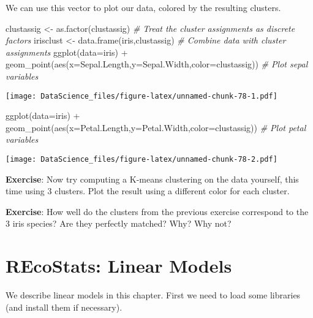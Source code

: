 \documentclass[
]{book}
\newenvironment{Shaded}{\begin{snugshade}}{\end{snugshade}}
\newcommand{\AttributeTok}[1]{\textcolor[rgb]{0.77,0.63,0.00}{#1}}
\newcommand{\CommentTok}[1]{\textcolor[rgb]{0.56,0.35,0.01}{\textit{#1}}}
\newcommand{\FunctionTok}[1]{\textcolor[rgb]{0.00,0.00,0.00}{#1}}
\newcommand{\NormalTok}[1]{#1}
\newcommand{\OtherTok}[1]{\textcolor[rgb]{0.56,0.35,0.01}{#1}}
\newcommand{\SpecialCharTok}[1]{\textcolor[rgb]{0.00,0.00,0.00}{#1}}
\begin{document}
We can use this vector to plot our data, colored by the resulting clusters.

\begin{Shaded}
\begin{Highlighting}[]
\NormalTok{clustassig }\OtherTok{\textless{}{-}} \FunctionTok{as.factor}\NormalTok{(clustassig) }\CommentTok{\# Treat the cluster assignments as discrete factors}
\NormalTok{irisclust }\OtherTok{\textless{}{-}} \FunctionTok{data.frame}\NormalTok{(iris,clustassig) }\CommentTok{\# Combine data with cluster assignments}
\FunctionTok{ggplot}\NormalTok{(}\AttributeTok{data=}\NormalTok{iris) }\SpecialCharTok{+} \FunctionTok{geom\_point}\NormalTok{(}\FunctionTok{aes}\NormalTok{(}\AttributeTok{x=}\NormalTok{Sepal.Length,}\AttributeTok{y=}\NormalTok{Sepal.Width,}\AttributeTok{color=}\NormalTok{clustassig)) }\CommentTok{\# Plot sepal variables}
\end{Highlighting}
\end{Shaded}

\texttt{[image: DataScience\_files/figure-latex/unnamed-chunk-78-1.pdf]}

\begin{Shaded}
\begin{Highlighting}[]
\FunctionTok{ggplot}\NormalTok{(}\AttributeTok{data=}\NormalTok{iris) }\SpecialCharTok{+} \FunctionTok{geom\_point}\NormalTok{(}\FunctionTok{aes}\NormalTok{(}\AttributeTok{x=}\NormalTok{Petal.Length,}\AttributeTok{y=}\NormalTok{Petal.Width,}\AttributeTok{color=}\NormalTok{clustassig)) }\CommentTok{\# Plot petal variables}
\end{Highlighting}
\end{Shaded}

\texttt{[image: DataScience\_files/figure-latex/unnamed-chunk-78-2.pdf]}

\textbf{Exercise}: Now try computing a K-means clustering on the data yourself, this time using 3 clusters. Plot the result using a different color for each cluster.

\textbf{Exercise}: How well do the clusters from the previous exercise correspond to the 3 iris species? Are they perfectly matched? Why? Why not?

\hypertarget{recostats-linear-models}{%
\chapter{REcoStats: Linear Models}\label{recostats-linear-models}}

We describe linear models in this chapter. First we need to load some libraries (and install them if necessary).
\end{document}

